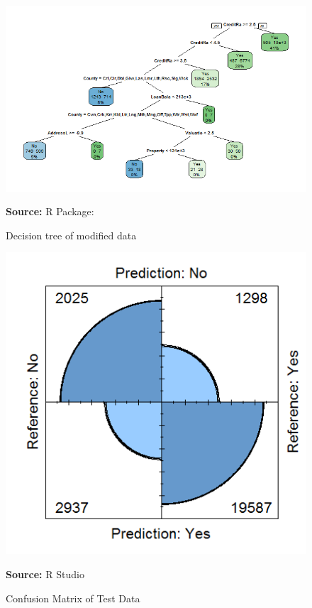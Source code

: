 \begin{center}
\begin{figure}[!htb]
\includegraphics[width=\textwidth]{DTmod.png}
\centering
\caption{Decision tree of modified data}{\textbf{Source:} R Package: \citep{rpart.plotpackage}}
\label{fig:DTmod}
\end{figure}
\end{center}

\begin{center}
\begin{figure}[!htb]
\includegraphics[scale=0.3]{DTcm.png}
\centering
\caption{Confusion Matrix of Test Data}{\textbf{Source:} R Studio}
\label{fig:DTcm}
\end{figure}
\end{center}

